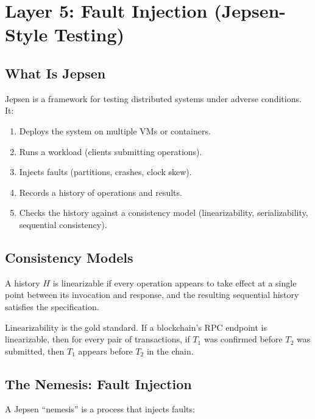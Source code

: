 \section{Layer 5: Fault Injection (Jepsen-Style Testing)}


\subsection{What Is Jepsen}

Jepsen is a framework for testing distributed systems under adverse conditions. It:
\begin{enumerate}[nosep]
  \item Deploys the system on multiple VMs or containers.
  \item Runs a workload (clients submitting operations).
  \item Injects faults (partitions, crashes, clock skew).
  \item Records a history of operations and results.
  \item Checks the history against a consistency model (linearizability, serializability,
    sequential consistency).
\end{enumerate}

\subsection{Consistency Models}

\begin{definition}[Linearizability]
A history $H$ is linearizable if every operation appears to take effect at a single
point between its invocation and response, and the resulting sequential history satisfies
the specification.
\end{definition}

Linearizability is the gold standard. If a blockchain's RPC endpoint is linearizable,
then for every pair of transactions, if $T_1$ was confirmed before $T_2$ was submitted,
then $T_1$ appears before $T_2$ in the chain.

\subsection{The Nemesis: Fault Injection}

A Jepsen ``nemesis'' is a process that injects faults:

